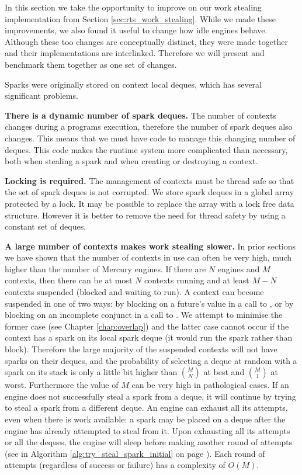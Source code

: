 

In this section we take the opportunity to improve on our work stealing
implementation from Section \ref{sec:rts_work_stealing}.
While we made these improvements,
we also found it useful to change how idle engines behave.
Although these too changes are conceptually distinct,
they were made together and their implementations are interlinked.
Therefore we will present and benchmark them together as one set of changes.

Sparks were originally stored on context local deques,
which has several significant problems.

\textbf{There is a dynamic number of spark deques.}
The number of contexts changes during a programs execution,
therefore the number of spark deques also changes.
This means that we must have code to manage this changing number of
deques.
This code makes the runtime system more complicated than necessary,
both when stealing a spark and when creating or destroying a context.

\textbf{Locking is required.}
The management of contexts must be thread safe so that the set of
spark deques is not corrupted.
We store spark deques in a global array protected by a lock.
It may be possible to replace the array with a lock free data structure.
However it is better to remove the need for thread safety by using a
constant set of deques.

\textbf{A large number of contexts makes work stealing slower.}
In prior sections
we have shown that the number of contexts in use can often be very high,
much higher than the number of Mercury engines.
If there are $N$ engines and $M$ contexts,
then there can be at most $N$ contexts running and
at least $M-N$ contexts suspended (blocked and waiting to run).
A context can become suspended in one of two ways:
by blocking on a future's value in a call to \wait,
or by blocking on an incomplete conjunct in a call to \joinandcontinue.
We attempt to minimise the former case (see Chapter \ref{chap:overlap})
and the latter case cannot occur
if the context has a spark on its local spark deque (it would run the
spark rather than block).
Therefore the large majority of the suspended contexts will not have
sparks on their deques,
and the probability of selecting a deque at random with a spark on its
stack is only a little bit higher than $M \choose N$ at best and
$M \choose 1$ at worst.
Furthermore the value of $M$ can be very high in pathological cases.
If an engine does not successfully steal a spark from a deque,
it will continue by trying to steal a spark from a different deque.
An engine can exhaust all its attempts, even when there is work
available:
a spark may be placed on a deque after the engine has already attempted
to steal from it.
Upon exhausting all its attempts or all the deques,
the engine will sleep before making another round of attempts
(see \trystealspark in Algorithm \ref{alg:try_steal_spark_initial} on
page \pageref{alg:try_steal_spark_initial}).
Each round of attempts (regardless of success or failure) has a
complexity of $O(M)$.

